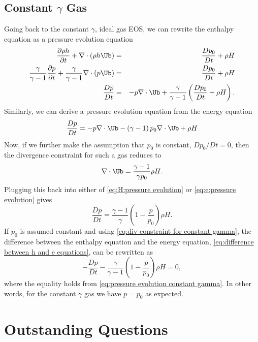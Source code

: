\subsection{Constant $\gamma$ Gas}
Going back to the constant $\gamma$, ideal gas EOS, we can rewrite the
enthalpy equation as a pressure evolution equation
\begin{eqnarray}
  \frac{\partial\rho h}{\partial t} + \nabla\cdot\left(\rho h\Ub\right) &=& \frac{Dp_0}{Dt} + \rho H {} \nonumber\\
  \frac{\gamma}{\gamma-1}\frac{\partial p}{\partial t} + \frac{\gamma}{\gamma-1}\nabla\cdot\left(p\Ub\right) &=& \frac{Dp_0}{Dt} + \rho H {} \nonumber\\
  \frac{Dp}{Dt} &=& -p\nabla\cdot\Ub + \frac{\gamma}{\gamma-1}\left(\frac{Dp_0}{Dt}+\rho H\right) \label{eq:H:pressure evolution}.
\end{eqnarray}
Similarly, we can derive a pressure evolution equation from the energy equation
\begin{equation}
  \frac{Dp}{Dt} = -p\nabla\cdot\Ub - \left(\gamma-1\right)p_0\nabla\cdot\Ub + \rho H \label{eq:e:pressure evolution}
\end{equation}
Now, if we further make the assumption that $p_0$ is constant,
$Dp_0/Dt = 0$, then the divergence constraint for such a gas reduces
to
\begin{equation}
\nabla\cdot\Ub = \frac{\gamma-1}{\gamma p_0}\rho H \label{eq:div constraint for constant gamma}.
\end{equation}
Plugging this back into either of \eqref{eq:H:pressure evolution} or
\eqref{eq:e:pressure evolution} gives
\begin{equation}
  \frac{Dp}{Dt} = \frac{\gamma-1}{\gamma}\left(1-\frac{p}{p_0}\right)\rho H. \label{eq:pressure evolution constant gamma}
\end{equation}
If $p_0$ is assumed constant and using \eqref{eq:div constraint for
  constant gamma}, the difference between the enthalpy equation and
the energy equation, \eqref{eq:difference between h and e equations},
can be rewritten as
\[
-\frac{Dp}{Dt} - \frac{\gamma}{\gamma-1}\left(1-\frac{p}{p_0}\right)\rho H = 0,
\]
where the equality holds from \eqref{eq:pressure evolution constant
  gamma}. In other words, for the constant $\gamma$ gas we have
$p=p_0$ as expected.


\section{Outstanding Questions}

